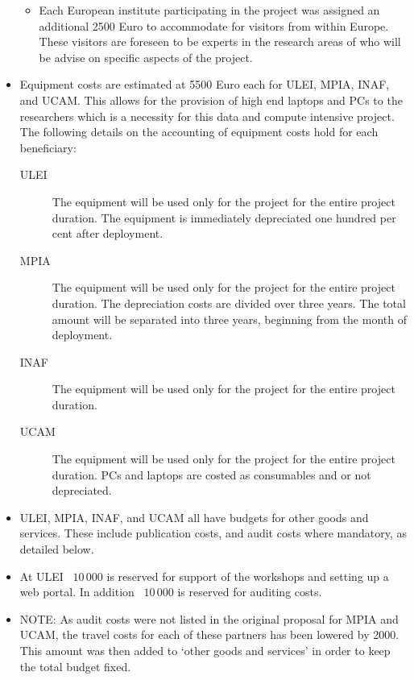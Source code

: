 \begin{itemize}
\begin{itemize}
        \item Each European institute participating in the project was assigned an additional 2500 Euro to accommodate for visitors from within Europe. These visitors are foreseen to be experts in the research areas of {\acro} who will be advise on specific aspects of the project.
    \end{itemize}
    \item Equipment costs are estimated at 5500 Euro each for ULEI, MPIA, INAF, and UCAM. This allows for the provision of high end laptops and PCs to the researchers which is a necessity for this data and compute intensive project. The following details on the accounting of equipment costs hold for each beneficiary:
    \begin{description}
        \item[ULEI] The equipment will be used only for the project for the entire project duration. The equipment is immediately depreciated one hundred per cent after deployment.
        \item[MPIA] The equipment will be used only for the project for the entire project duration. The depreciation costs are divided over three years. The total amount will be separated into three years, beginning from the month of deployment.
        \item[INAF] The equipment will be used only for the project for the entire project duration.
        \item[UCAM] The equipment will be used only for the project for the entire project duration. PCs and laptops are costed as consumables and or not depreciated.
    \end{description}
    \item ULEI, MPIA, INAF, and UCAM all have budgets for other goods and services. These include publication costs, and audit costs where mandatory, as detailed below.
    \item At ULEI \EUR\ $10\,000$ is reserved for support of the workshops and setting up a web portal. In addition \EUR\ $10\,000$ is reserved for auditing costs.
    \item NOTE: As audit costs were not listed in the original proposal for MPIA and UCAM, the travel costs for each of these partners has been lowered by 2000\EUR. This amount was then added to `other goods and services' in order to keep the total budget fixed.
\end{itemize}

